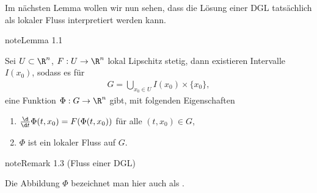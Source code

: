 \documentclass[letterpaper,10pt,english]{jupyterBook}
\begin{document}
\sphinxAtStartPar
Im nächsten Lemma wollen wir nun sehen, dass die Lösung einer DGL tatsächlich als lokaler Fluss interpretiert werden kann.
\label{ode/fluesse:lemma-3}
\begin{sphinxadmonition}{note}{Lemma 1.1}



\sphinxAtStartPar
Sei \(U\subset\R^n\), \(F:U \rightarrow \R^n\) lokal Lipschitz stetig, dann existieren Intervalle \(I(x_0)\), sodass es für
\begin{equation*}
\begin{split}G = \bigcup_{x_0\in U} I(x_0)\times\{x_0\},\end{split}
\end{equation*}
\sphinxAtStartPar
eine Funktion \(\Phi:G\rightarrow \R^n\) gibt, mit folgenden Eigenschaften
\begin{enumerate}
%
\item {} 
\sphinxAtStartPar
\(\frac{\d}{\d t} \Phi(t, x_0) = F(\Phi(t, x_0))\) für alle \((t,x_0)\in G\),

\item {} 
\sphinxAtStartPar
\(\Phi\) ist ein lokaler Fluss auf \(G\).

\end{enumerate}
\end{sphinxadmonition}
\label{ode/fluesse:rem:fluss_dgl}
\begin{sphinxadmonition}{note}{Remark 1.3 (Fluss einer DGL)}



\sphinxAtStartPar
Die Abbildung \(\Phi\) bezeichnet man hier auch als .
\end{sphinxadmonition}
\end{document}

